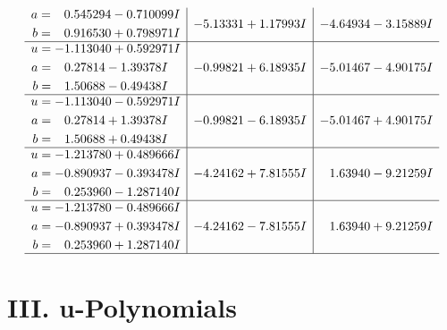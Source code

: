 \documentclass[1p]{elsarticle_modified}
\theoremstyle{definition}
\begin{document}
$$\begin{array}{c|c|c}
\begin{aligned}
a &= \phantom{-}0.545294 - 0.710099 I \\
b &= \phantom{-}0.916530 + 0.798971 I\end{aligned}
 & -5.13331 + 1.17993 I & -4.64934 - 3.15889 I \\ \hline\begin{aligned}
u &= -1.113040 + 0.592971 I \\
a &= \phantom{-}0.27814 - 1.39378 I \\
b &= \phantom{-}1.50688 - 0.49438 I\end{aligned}
 & -0.99821 + 6.18935 I & -5.01467 - 4.90175 I \\ \hline\begin{aligned}
u &= -1.113040 - 0.592971 I \\
a &= \phantom{-}0.27814 + 1.39378 I \\
b &= \phantom{-}1.50688 + 0.49438 I\end{aligned}
 & -0.99821 - 6.18935 I & -5.01467 + 4.90175 I \\ \hline\begin{aligned}
u &= -1.213780 + 0.489666 I \\
a &= -0.890937 - 0.393478 I \\
b &= \phantom{-}0.253960 - 1.287140 I\end{aligned}
 & -4.24162 + 7.81555 I & \phantom{-}1.63940 - 9.21259 I \\ \hline\begin{aligned}
u &= -1.213780 - 0.489666 I \\
a &= -0.890937 + 0.393478 I \\
b &= \phantom{-}0.253960 + 1.287140 I\end{aligned}
 & -4.24162 - 7.81555 I & \phantom{-}1.63940 + 9.21259 I\\
 \hline 
 \end{array}$$\newpage
\newpage\renewcommand{\arraystretch}{1}
\centering \section*{ III. u-Polynomials}
\end{document}

